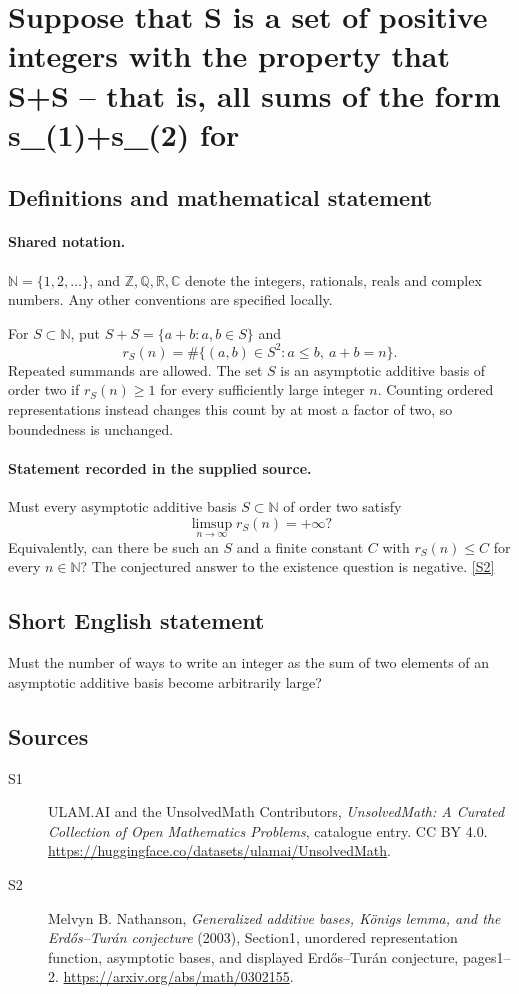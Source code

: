 \documentclass[11pt]{article}
\newcommand{\sref}[2]{\hyperlink{source:#1:#2}{[S#2]}}
\begin{document}
\section{Suppose that S is a set of positive integers with the property that S+S -- that is, all sums of the form s\_(1)+s\_(2) for}\label{statement}

\subsection{Definitions and mathematical statement}

\paragraph{Shared notation.}$\mathbb N=\{1,2,\ldots\}$, and $\mathbb Z,\mathbb Q,\mathbb R,\mathbb C$ denote the integers, rationals, reals and complex numbers. Any other conventions are specified locally.


For $S\subset\mathbb N$, put $S+S=\{a+b:a,b\in S\}$ and
\[r_S(n)=\#\{(a,b)\in S^2:a\le b,\ a+b=n\}.\]
Repeated summands are allowed. The set $S$ is an asymptotic additive basis of order two if $r_S(n)\ge1$ for every sufficiently large integer $n$. Counting ordered representations instead changes this count by at most a factor of two, so boundedness is unchanged.

\paragraph{Statement recorded in the supplied source.}
Must every asymptotic additive basis $S\subset\mathbb N$ of order two satisfy
\[\limsup_{n\to\infty}r_S(n)=+\infty?\]
Equivalently, can there be such an $S$ and a finite constant $C$ with $r_S(n)\le C$ for every $n\in\mathbb N$? The conjectured answer to the existence question is negative. \sref{statement}{2}

\subsection{Short English statement}
Must the number of ways to write an integer as the sum of two elements of an asymptotic additive basis become arbitrarily large?
\subsection{Sources}
\begin{description}
\item[\hypertarget{source:statement:1}{S1}] ULAM.AI and the UnsolvedMath Contributors, \emph{UnsolvedMath: A Curated Collection of Open Mathematics Problems}, catalogue entry. CC BY 4.0. \url{https://huggingface.co/datasets/ulamai/UnsolvedMath}.
\item[\hypertarget{source:statement:2}{S2}] Melvyn B. Nathanson, \emph{Generalized additive bases, König\textquotesingle s lemma, and the Erdős--Turán conjecture} (2003), Section1, unordered representation function, asymptotic bases, and displayed Erdős--Turán conjecture, pages1--2. \url{https://arxiv.org/abs/math/0302155}.
\end{description}
\label{end:statement}
\end{document}
